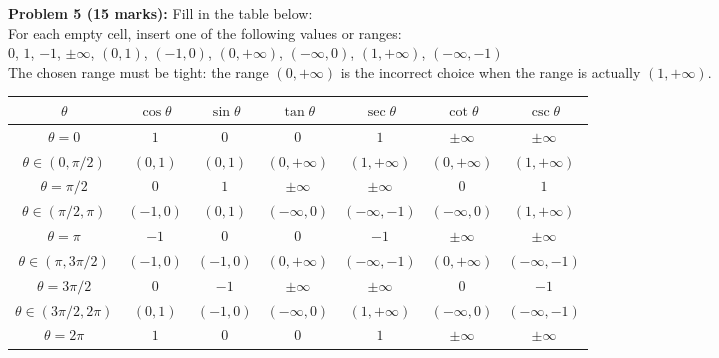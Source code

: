 \documentclass{article}
\newcommand{\dr}[1]{\textcolor{dark_red}{#1}}
\begin{document}
\begin{framed}
\textbf{Problem 5 (15 marks):} Fill in the table below: \\
For each empty cell, insert one of the following values or ranges: \\
\(0\), \(1\), \(-1\), \(\pm\infty\), \((0, 1)\), \((-1, 0)\), \((0, +\infty)\), \((-\infty, 0)\), \((1, +\infty)\), \((-\infty, -1)\) \\
The chosen range must be tight: the range \((0, +\infty)\) is the incorrect choice when the range is actually \((1, +\infty)\). \\
\begin{tabular}{|c||c|c||c|c||c|c|}
\hline
\(\theta\)                            & \(\cos\theta\) & \(\sin\theta\) &          \(\tan\theta\) &          \(\sec\theta\) &           \(\cot\theta\) &         \(\csc\theta\) \\
\hline
\hline
\(\theta = 0\)                      &              \(1\) &               \(0\) &                          \(0\) &                        \(1\) &             \(\pm\infty\) &           \(\pm\infty\) \\
\hline
\(\theta \in (0, \pi/2)\)        &         \((0,1)\) &         \((0,1)\) &          \((0,+\infty)\) &         \((1,+\infty)\) &          \((0,+\infty)\) &         \((1,+\infty)\) \\
\hline
\(\theta = \pi/2\)                &               \(0\) &               \(1\) &             \(\pm\infty\) &            \(\pm\infty\) &                         \(0\) &                        \(1\) \\
\hline
\(\theta \in (\pi/2, \pi)\)     &        \((-1,0)\) &          \((0,1)\) &          \((-\infty, 0)\) &         \((-\infty, -1)\) &          \((-\infty,0)\) &         \((1,+\infty)\) \\
\hline
\(\theta = \pi\)                  &     \dr{\(-1\)}  &         \dr{\(0\)} &                \dr{\(0\)} &                \dr{\(-1\)} &    \dr{\(\pm\infty\)} &    \dr{\(\pm\infty\)} \\
\hline
\(\theta \in (\pi, 3\pi/2)\)  & \dr{\((-1,0)\)} & \dr{\((-1,0)\)} & \dr{\((0,+\infty)\)} & \dr{\((-\infty, -1)\)} & \dr{\((0,+\infty)\)} & \dr{\((-\infty,-1)\)} \\
\hline
\(\theta = 3\pi/2\)             &       \dr{\(0\)} &        \dr{\(-1\)} &    \dr{\(\pm\infty\)} &    \dr{\(\pm\infty\)} &                \dr{\(0\)} &               \dr{\(-1\)} \\
\hline
\(\theta \in (3\pi/2, 2\pi)\) & \dr{\((0,1)\)} & \dr{\((-1,0)\)} &   \dr{\((-\infty,0)\)} &  \dr{\((1,+\infty)\)} &  \dr{\((-\infty,0)\)} & \dr{\((-\infty,-1)\)} \\
\hline
\(\theta = 2\pi\)                &       \dr{\(1\)} &         \dr{\(0\)} &                 \dr{\(0\)} &                 \dr{\(1\)} &    \dr{\(\pm\infty\)} &    \dr{\(\pm\infty\)} \\
\hline
\end{tabular}
\end{framed}
\end{document}
